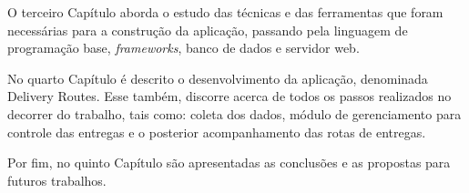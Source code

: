 O terceiro Capítulo aborda o estudo das técnicas e das ferramentas que foram necessárias para a construção da aplicação, passando pela linguagem de programação base, \textit{frameworks}, banco de dados e servidor web.

No quarto Capítulo é descrito o desenvolvimento da aplicação, denominada Delivery Routes. Esse também, discorre acerca de todos os passos realizados no decorrer do trabalho, tais como: coleta dos dados, módulo de gerenciamento para controle das entregas e o posterior acompanhamento das rotas de entregas.

Por fim, no quinto Capítulo são apresentadas as conclusões e as propostas para futuros trabalhos.